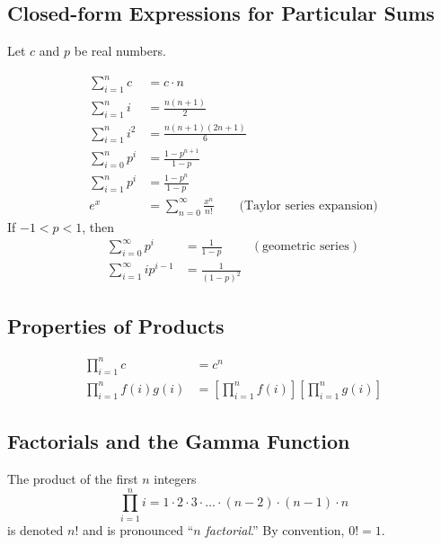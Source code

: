 \subsection{Closed-form Expressions for Particular Sums}

Let $c$ and $p$ be real numbers.

\begin{equation*}
    \begin{aligned}
        \sum_{i = 1}^n c & = c \cdot n  \\ 
        \sum_{i = 1}^n i & = \frac{n(n+1)}{2}  \\ 
        \sum_{i = 1}^n i^2 & = \frac{n(n+1)(2n+1)}{6} \\
        \sum_{i = 0}^n p^i & = \frac{1 - p^{n+1}}{1 - p} \\
        \sum_{i = 1}^n p^i & = \frac{1 - p^n}{1 - p} \\
        e^x & = \sum_{n = 0}^\infty \frac{x^n}{n!} \qquad \text{(Taylor series expansion)}
    \end{aligned}
\end{equation*}
If $-1 < p < 1$, then
\begin{equation*}
    \begin{aligned}
        \sum_{i = 0}^\infty p^i & = \frac{1}{1 - p} & (\text{geometric series}) \\
        \sum_{i = 1}^\infty i p^{i - 1} & = \frac{1}{(1 - p)^2} & 
    \end{aligned}
\end{equation*}

\subsection{Properties of Products}

\begin{equation*}
    \begin{aligned}
        \prod_{i = 1}^n c & = c^n  \\ 
        \prod_{i = 1}^n f(i) g(i) & = \left[\prod_{i = 1}^n f(i)\right] \left[\prod_{i = 1}^n g(i)\right] 
    \end{aligned}
\end{equation*}

\subsection{Factorials and the Gamma Function}

The product of the first $n$ integers
\begin{equation*}
    \prod_{i = 1}^n i = 1 \cdot 2 \cdot 3 \cdot \ldots \cdot (n-2) \cdot (n-1) \cdot n
\end{equation*}
is denoted $n!$ and is pronounced ``$n$ \textit{factorial}.'' By convention, $0! = 1$.

